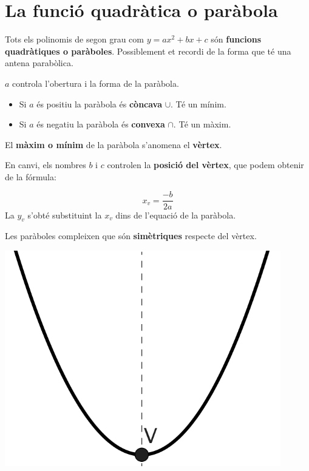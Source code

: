 \section{La funció quadràtica o paràbola}

\begin{theorybox}


Tots els polinomis de segon grau com $y=ax^2+bx+c$ són \textbf{funcions quadràtiques o paràboles}. Possiblement et recordi de la forma que té una antena parabòlica.


$a$ controla l'obertura i la forma de la paràbola. 
\begin{itemize}
	\item Si $a$ és positiu la paràbola és \textbf{còncava} $\cup$. Té un mínim.
	\item Si $a$ és negatiu la paràbola és \textbf{convexa} $\cap$. Té un màxim.
\end{itemize}

El \textbf{màxim o mínim} de la paràbola s'anomena el \textbf{vèrtex}.

En canvi, els nombres $b$ i $c$ controlen la \textbf{posició del vèrtex}, que podem obtenir de la fórmula:

\begin{minipage}{0.7\textwidth}
\begin{equation*}
x_v = \frac{-b}{2a}
\end{equation*}
La $y_v$ s'obté substituint la $x_v$ dins de l'equació de la paràbola.

Les paràboles compleixen que són \textbf{simètriques} respecte del vèrtex.
\end{minipage}
\begin{minipage}{0.25\textwidth}
	\centering
	\includegraphics[width=0.9\textwidth]{img-08/parabola}
\end{minipage}
\end{theorybox}	


